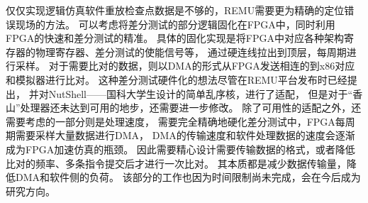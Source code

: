 仅仅实现逻辑仿真软件重放检查点数据是不够的，REMU需要更为精确的定位错误现场的方法。
可以考虑将差分测试的部分逻辑固化在FPGA中，同时利用FPGA的快速和差分测试的精准。
具体的固化实现是将FPGA中对应各种架构寄存器的物理寄存器、差分测试的使能信号等，
通过硬连线拉出到顶层，每周期进行采样。
对于需要比对的数据，则以DMA的形式从FPGA发送相连的到x86对应和模拟器进行比对。
这种差分测试硬件化的想法尽管在REMU平台发布时已经提出，
并对NutShell——国科大学生设计的简单乱序核，进行了适配，
但是对于“香山”处理器还未达到可用的地步，还需要进一步修改。
除了可用性的适配之外，还需要考虑的一部分则是处理速度，
需要完全精确地硬化差分测试中，FPGA每周期需要采样大量数据进行DMA，
DMA的传输速度和软件处理数据的速度会逐渐成为FPGA加速仿真的瓶颈。
因此需要精心设计需要传输数据的格式，或者降低比对的频率、多条指令提交后才进行一次比对。
其本质都是减少数据传输量，降低DMA和软件侧的负荷。
该部分的工作也因为时间限制尚未完成，会在今后成为研究方向。